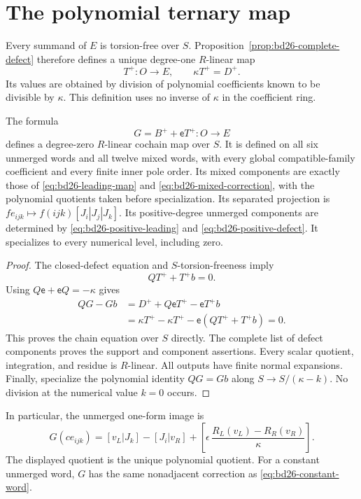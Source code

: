 \section{The polynomial ternary map}

Every summand of $E$ is torsion-free over $S$.
Proposition~\ref{prop:bd26-complete-defect} therefore defines a unique degree-one $R$-linear map
\[
 T^+:O\longrightarrow E,
 \qquad \kappa T^+=D^+.
\]
Its values are obtained by division of polynomial coefficients known to be divisible by $\kappa$.
This definition uses no inverse of $\kappa$ in the coefficient ring.

\begin{theorem}\label{thm:bd26-polynomial-complete}
The formula
\begin{equation}\label{eq:bd26-polynomial-complete}
 G=B^++\mathsf eT^+:O\longrightarrow E
\end{equation}
defines a degree-zero $R$-linear cochain map over $S$.
It is defined on all six unmerged words and all twelve mixed words, with every global compatible-family coefficient and every finite inner pole order.
Its mixed components are exactly those of \eqref{eq:bd26-leading-map} and \eqref{eq:bd26-mixed-correction}, with the polynomial quotients taken before specialization.
Its separated projection is $fe_{ijk}\mapsto f(ijk)[J_i|J_j|J_k]$.
Its positive-degree unmerged components are determined by \eqref{eq:bd26-positive-leading} and \eqref{eq:bd26-positive-defect}.
It specializes to every numerical level, including zero.
\end{theorem}
\begin{proof}
The closed-defect equation and $S$-torsion-freeness imply
\[
 QT^++T^+b=0.
\]
Using $Q\mathsf e+\mathsf eQ=-\kappa$ gives
\[
 \begin{aligned}
 QG-Gb
 &=D^++Q\mathsf eT^+-\mathsf eT^+b\\
 &=\kappa T^+-\kappa T^+-\mathsf e(QT^++T^+b)=0.
 \end{aligned}
\]
This proves the chain equation over $S$ directly.
The complete list of defect components proves the support and component assertions.
Every scalar quotient, integration, and residue is $R$-linear.
All outputs have finite normal expansions.
Finally, specialize the polynomial identity $QG=Gb$ along $S\to S/(\kappa-k)$.
No division at the numerical value $k=0$ occurs.
\end{proof}

In particular, the unmerged one-form image is
\begin{equation}\label{eq:bd26-polynomial-oneform}
 G(ce_{ijk})=[v_L|J_k]-[J_i|v_R]
   +\left[\epsilon\,\frac{R_L(v_L)-R_R(v_R)}\kappa\right].
\end{equation}
The displayed quotient is the unique polynomial quotient.
For a constant unmerged word, $G$ has the same nonadjacent correction as \eqref{eq:bd26-constant-word}.

